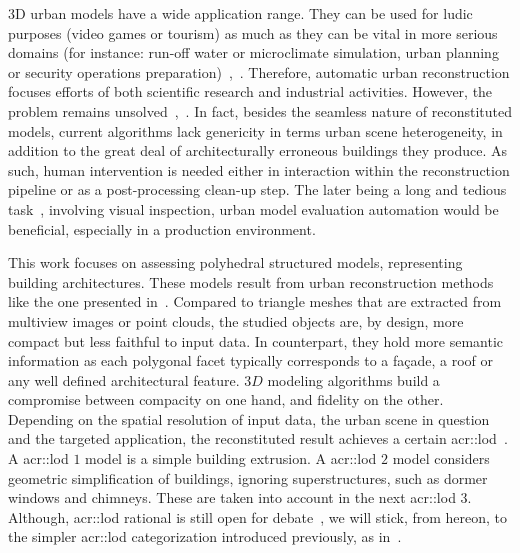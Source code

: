 \documentclass[runningheads]{llncs}
\begin{document}
    3D urban models have a wide application range. They can be used for ludic purposes (video games or tourism) as much as they can be vital in more serious domains (for instance: run-off water or microclimate simulation, urban planning or security operations preparation)~\cite{Biljecki2015},~\cite{Musialski2012}. Therefore, automatic urban reconstruction focuses efforts of both scientific research and industrial activities. However, the problem remains unsolved~\cite{Musialski2012},~\cite{rottensteiner2014results}. In fact, besides the seamless nature of reconstituted models, current algorithms lack genericity in terms urban scene heterogeneity, in addition to the great deal of architecturally erroneous buildings they produce. As such, human intervention is needed either in interaction within the reconstruction pipeline or as a post-processing clean-up step. The later being a long and tedious task~\cite{Musialski2012}, involving visual inspection, urban model evaluation automation would be beneficial, especially in a production environment.

    This work focuses on assessing polyhedral structured models, representing building architectures. These models result from urban reconstruction methods like the one presented in~\cite{dick2004modelling}. Compared to triangle meshes that are extracted from multiview images or point clouds, the studied objects are, by design, more compact but less faithful to input data. In counterpart, they hold more semantic information as each polygonal facet typically corresponds to a fa\c{c}ade, a roof or any well defined architectural feature. $3D$ modeling algorithms build a compromise between compacity on one hand, and fidelity on the other. Depending on the spatial resolution of input data, the urban scene in question and the targeted application, the reconstituted result achieves a certain \gls{acr::lod}~\cite{kolbe2005citygml}. A \acrshort{acr::lod} $1$ model is a simple building extrusion. A \acrshort{acr::lod} $2$ model considers geometric simplification of buildings, ignoring superstructures, such as dormer windows and chimneys. These are taken into account in the next \acrshort{acr::lod} $3$. Although, \acrshort{acr::lod} rational is still open for debate~\cite{2016_ceus_improved_lod}, we will stick, from hereon, to the simpler \acrshort{acr::lod} categorization introduced previously, as in~\cite{verdie2015lod}.
\end{document}
